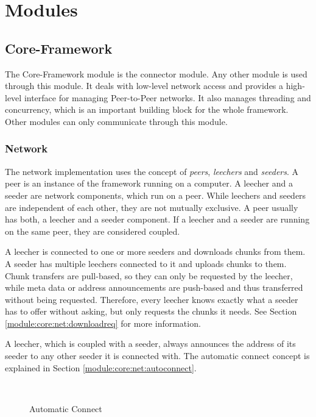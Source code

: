 
\chapter{Modules}
\label{module}

\section{Core-Framework}
\label{module:core}

The Core-Framework module is the connector module. Any other module is used through this module. It deals with low-level network access and provides a high-level interface for managing Peer-to-Peer networks. It also manages threading and concurrency, which is an important building block for the whole framework. Other modules can only communicate through this module.

\subsection{Network}
\label{module:core:net}
The network implementation uses the concept of \emph{peers}, \emph{leechers} and \emph{seeders}. A peer is an instance of the framework running on a computer. A leecher and a seeder are network components, which run on a peer. While leechers and seeders are independent of each other, they are not mutually exclusive. A peer usually has both, a leecher and a seeder component. If a leecher and a seeder are running on the same peer, they are considered coupled. 

A leecher is connected to one or more seeders and downloads chunks from them. A seeder has multiple leechers connected to it and uploads chunks to them. Chunk transfers are pull-based, so they can only be requested by the leecher, while meta data or address announcements are push-based and thus transferred without being requested. Therefore, every leecher knows exactly what a seeder has to offer without asking, but only requests the chunks it needs. See Section \ref{module:core:net:downloadreq} for more information.

A leecher, which is coupled with a seeder, always announces the address of its seeder to any other seeder it is connected with. The automatic connect concept is explained in Section \ref{module:core:net:autoconnect}.

\pagebreak

\begin{figure}[t]
	\begin{center}

		~ %

		\caption{Automatic Connect}
	\end{center}
\end{figure}

